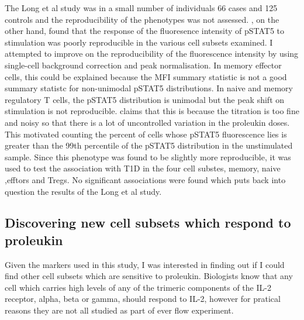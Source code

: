 The Long et al study was in a small number of individuals 66 cases and 125 controls and the reproducibility of the phenotypes was not assessed.
, on the other hand, found that the response of the fluoresence intensity of pSTAT5 to stimulation was poorly reproducible in the various cell subsets
examined.  I attempted to improve on the reproducibility of the fluorescence intensity by using single-cell background correction and peak normalisation.
In memory effector cells, this could be explained because the MFI summary statistic is not a good summary statistc for non-unimodal pSTAT5 distributions.
In naive and memory regulatory T cells, the pSTAT5 distribution is unimodal but the peak shift on stimulation is not reproducible.
 claims that this is because the titration is too fine and noisy so that there is a lot of uncontrolled variation in the proleukin doses.
This motivated counting the percent of cells whose pSTAT5 fluorescence lies is greater than the 99th percentile of the pSTAT5 distribution in the unstimulated sample.
Since this phenotype was found to be slightly more reproducible, it was used to test the association with T1D in the four cell substes, memory, naive ,efftors and Tregs.
No significant associations were found which puts back into question the results of the Long et al study.

\subsection{Discovering new cell subsets which respond to proleukin}

Given the markers used in this study, I was interested in finding out if I could find other cell subsets which are sensitive to proleukin.
Biologists know that any cell which carries high levels of any of the trimeric components of the IL-2 receptor, alpha, beta or gamma,
should respond to IL-2, however for pratical reasons they are not all studied as part of ever flow experiment.







